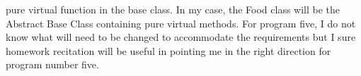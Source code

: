 \documentclass[11pt, a4paper]{article}
\begin{document}
pure virtual function in the base class. In my case, the Food class will be the Abstract Base Class containing pure virtual methods. For program five, I do not know what will need to be changed to accommodate the requirements but I sure homework recitation will be useful in pointing me in the right direction for program number five.
\end{document}
